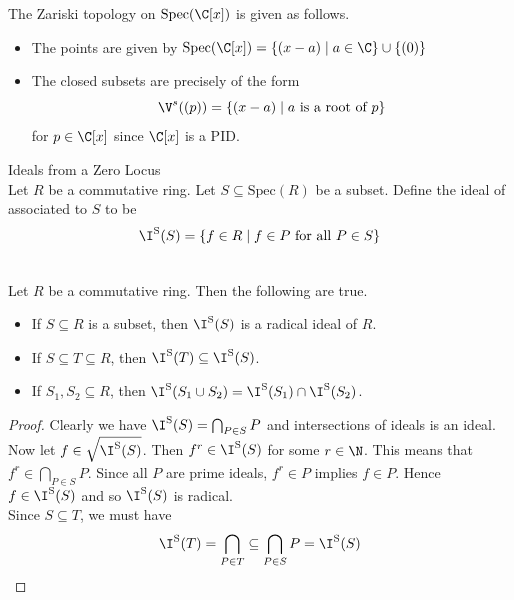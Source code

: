 \documentclass[a4paper]{article}
\begin{document}
\begin{eg}{}{} The Zariski topology on $\text{Spec}(\C[x])$ is given as follows. 
\begin{itemize}
\item The points are given by $\text{Spec}(\C[x])=\{(x-a)\;|\;a\in\C\}\cup\{(0)\}$
\item The closed subsets are precisely of the form $$\V^s((p))=\{(x-a)\;|\;a\text{ is a root of }p\}$$ for $p\in\C[x]$ since $\C[x]$ is a PID. 
\end{itemize}
\end{eg}

\begin{defn}{Ideals from a Zero Locus}{}\\
Let $R$ be a commutative ring. Let $S\subseteq\text{Spec}(R)$ be a subset. Define the ideal of associated to $S$ to be $$\I^\text{S}(S)=\{f\in R\;|\;f\in P\text{ for all }P\in S\}$$
\end{defn}

\begin{lmm}{}{}\\
Let $R$ be a commutative ring. Then the following are true. 
\begin{itemize}
\item If $S\subseteq R$ is a subset, then $\I^\text{S}(S)$ is a radical ideal of $R$. 
\item If $S\subseteq T\subseteq R$, then $\I^\text{S}(T)\subseteq\I^\text{S}(S)$. 
\item If $S_1,S_2\subseteq R$, then $\I^\text{S}(S_1\cup S_2)=\I^\text{S}(S_1)\cap\I^\text{S}(S_2)$. 
\end{itemize}
\begin{proof}
Clearly we have $\I^\text{S}(S)=\bigcap_{P\in S}P$ and intersections of ideals is an ideal. Now let $f\in\sqrt{\I^\text{S}(S)}$. Then $f^r\in\I^\text{S}(S)$ for some $r\in\N$. This means that $f^r\in\bigcap_{P\in S}P$. Since all $P$ are prime ideals, $f^r\in P$ implies $f\in P$. Hence $f\in\I^\text{S}(S)$ and so $\I^\text{S}(S)$ is radical. \\

Since $S\subseteq T$, we must have $$\I^\text{S}(T)=\bigcap_{P\in T}\subseteq\bigcap_{P\in S}P=\I^\text{S}(S)$$
\end{proof}
\end{lmm}
\end{document}
